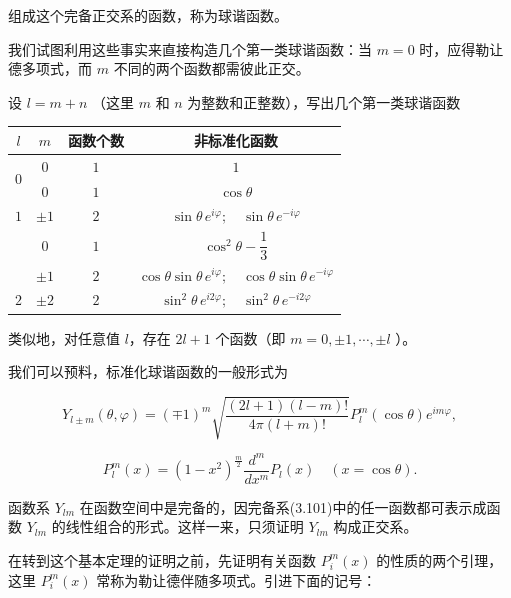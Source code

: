 组成这个完备正交系的函数，称为球谐函数。
\par\nopagebreak\vspace{-1.6em}
\vspace{0.15em}

我们试图利用这些事实来直接构造几个第一类球谐函数：当 $m = 0$ 时，应得勒让德多项式，而 $m$ 不同的两个函数都需彼此正交。

设 $l = m + n$ （这里 $m$ 和 $n$ 为整数和正整数），写出几个第一类球谐函数

\begin{center}
\begin{tabular}{|c|c|c|c|}
\hline
$l$ & $m$ & 函数个数 & 非标准化函数\\
\hline
\multirow{2}{*}{$0$} & $0$ & $1$ & $1$\\
 & $0$ & $1$ & $\cos\theta$\\
\hline
$1$ & $\pm 1$ & $2$ & $\sin\theta\, e^{i\varphi};\quad \sin\theta\, e^{-i\varphi}$\\
\hline
 & $0$ & $1$ & $\cos^{2}\theta - \dfrac{1}{3}$\\
 & $\pm 1$ & $2$ & $\cos\theta\sin\theta\, e^{i\varphi};\quad \cos\theta\sin\theta\, e^{-i\varphi}$\\
$2$ & $\pm 2$ & $2$ & $\sin^{2}\theta\, e^{i2\varphi};\quad \sin^{2}\theta\, e^{-i2\varphi}$\\
\hline
\end{tabular}
\end{center}

类似地，对任意值 $l$，存在 $2l + 1$ 个函数（即 $m = 0, \pm 1, \cdots, \pm l$ ）。

我们可以预料，标准化球谐函数的一般形式为

\begin{equation*}
Y _ {l \pm m} (\theta , \varphi) = (\mp 1) ^ {m} \sqrt {\frac {(2 l + 1) (l - m) !}{4 \pi (l + m) !}} P _ {l} ^ {m} (\cos \theta) e ^ {i m \varphi},\tag{3.103}
\end{equation*}

\begin{equation*}
P _ {l} ^ {m} (x) = \left(1 - x ^ {2}\right) ^ {\frac {m}{2}} \frac {d ^ {m}}{d x ^ {m}} P _ {l} (x) \quad (x = \cos \theta).\tag{3.104}
\end{equation*}

函数系 $Y_{lm}$ 在函数空间中是完备的，因完备系(3.101)中的任一函数都可表示成函数 $Y_{lm}$ 的线性组合的形式。这样一来，只须证明 $Y_{lm}$ 构成正交系。

在转到这个基本定理的证明之前，先证明有关函数 $P_{i}^{m}(x)$ 的性质的两个引理，这里 $P_{i}^{m}(x)$ 常称为勒让德伴随多项式。引进下面的记号：

